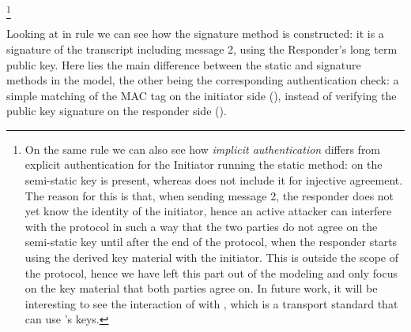 %
%
\footnote{
On the same rule we can also see how \emph{implicit authentication}
differs from explicit authentication for the Initiator running the
static method: on  the semi-static key
\mGiy{} is present, whereas  does not include it
for injective agreement.
%
The reason for this is that, when sending message 2, the responder
does not yet know the identity of the initiator, hence an active
attacker can interfere with the protocol in such a way that the two
parties do not agree on the semi-static key
\mGiy{} until after the end of the protocol, when the responder
starts using the derived key material with the initiator.
%
This is outside the scope of the \mEdhoc{} protocol, hence we have left
this part out of the modeling and only focus on the key material that
both parties agree on.
%
In future work, it will be interesting to see the interaction of
\mEdhoc{} with \mOscore, which is a transport standard that can use
\mEdhoc's keys.}

Looking at  in rule  we can
see how the signature method is constructed: it is a signature of the
transcript including message 2, using the Responder's long term public
key.
%
Here lies the main difference between the static and signature methods
in the model, the other being the corresponding authentication check:
a simple matching of the MAC tag on the initiator side
%
(), instead of verifying the public key
signature on the responder side
%
().

